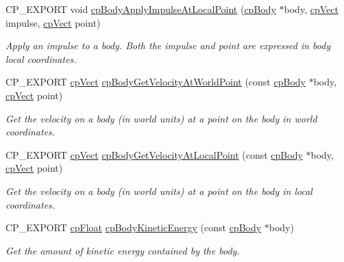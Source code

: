 \begin{DoxyCompactItemize}
C\+P\+\_\+\+E\+X\+P\+O\+RT void \mbox{\hyperlink{group__cp_body_ga0bd09fbbf2a3260b7cda569dacec0a33}{cp\+Body\+Apply\+Impulse\+At\+Local\+Point}} (\mbox{\hyperlink{structcp_body}{cp\+Body}} $\ast$body, \mbox{\hyperlink{structcp_vect}{cp\+Vect}} impulse, \mbox{\hyperlink{structcp_vect}{cp\+Vect}} point)
\begin{DoxyCompactList}\small\item\em Apply an impulse to a body. Both the impulse and point are expressed in body local coordinates. \end{DoxyCompactList}\item 
\mbox{\label{group__cp_body_gac53993c244cf2f792e6ae096b50ea9c3}} 
C\+P\+\_\+\+E\+X\+P\+O\+RT \mbox{\hyperlink{structcp_vect}{cp\+Vect}} \mbox{\hyperlink{group__cp_body_gac53993c244cf2f792e6ae096b50ea9c3}{cp\+Body\+Get\+Velocity\+At\+World\+Point}} (const \mbox{\hyperlink{structcp_body}{cp\+Body}} $\ast$body, \mbox{\hyperlink{structcp_vect}{cp\+Vect}} point)
\begin{DoxyCompactList}\small\item\em Get the velocity on a body (in world units) at a point on the body in world coordinates. \end{DoxyCompactList}\item 
\mbox{\label{group__cp_body_ga5ce88dc62ccd4a7dffe59d0fa217f61e}} 
C\+P\+\_\+\+E\+X\+P\+O\+RT \mbox{\hyperlink{structcp_vect}{cp\+Vect}} \mbox{\hyperlink{group__cp_body_ga5ce88dc62ccd4a7dffe59d0fa217f61e}{cp\+Body\+Get\+Velocity\+At\+Local\+Point}} (const \mbox{\hyperlink{structcp_body}{cp\+Body}} $\ast$body, \mbox{\hyperlink{structcp_vect}{cp\+Vect}} point)
\begin{DoxyCompactList}\small\item\em Get the velocity on a body (in world units) at a point on the body in local coordinates. \end{DoxyCompactList}\item 
\mbox{\label{group__cp_body_ga97f83b89ca7faa47a4862aa1eade34cc}} 
C\+P\+\_\+\+E\+X\+P\+O\+RT \mbox{\hyperlink{group__basic_types_gac1ed65573e035bf892505768c852d8d3}{cp\+Float}} \mbox{\hyperlink{group__cp_body_ga97f83b89ca7faa47a4862aa1eade34cc}{cp\+Body\+Kinetic\+Energy}} (const \mbox{\hyperlink{structcp_body}{cp\+Body}} $\ast$body)
\begin{DoxyCompactList}\small\item\em Get the amount of kinetic energy contained by the body. \end{DoxyCompactList}\item 

\end{DoxyCompactItemize}
